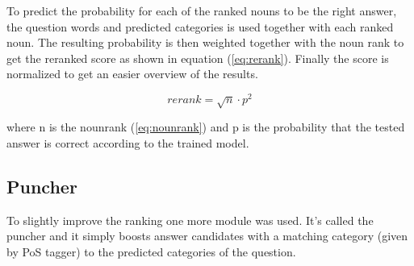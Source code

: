 To predict the probability for each of the ranked nouns to be the right answer, the question words and predicted categories
is used together with each ranked noun. The resulting probability is then weighted together with the noun rank to get the
reranked score as shown in equation (\ref{eq:rerank}). Finally the score is normalized to get an easier overview of the results.

\begin{equation}
rerank = \sqrt{n} \cdot p^2
\label{eq:rerank}
\end{equation}

where n is the nounrank (\ref{eq:nounrank}) and p is the probability that the tested answer is correct according 
to the trained model.

\subsection{Puncher}

To slightly improve the ranking one more module was used. It's called the puncher and it simply boosts 
answer candidates with a matching category (given by PoS tagger) to the predicted categories of the question. 
